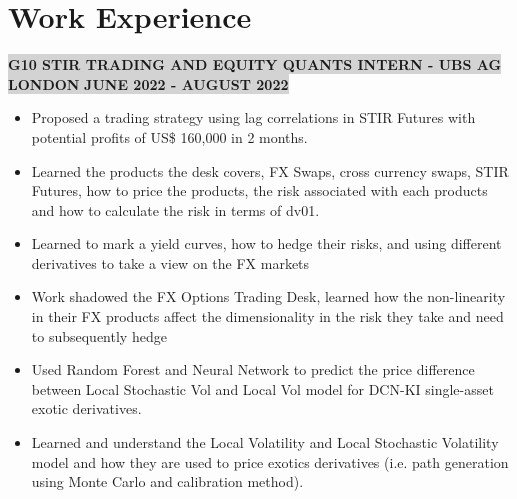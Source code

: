 \documentclass[10pt]{article}
\begin{document}
\section*{\sffamily Work Experience}
\vspace{-0.25cm}

\begin{comment}
\begin{center}
{{\fontfamily{lmtt}\colorbox{lightgrey}{\textbf{PIPELINE ENGINEER - SHELL UK ABERDEEN } \quad \quad\quad\quad \quad \quad \quad\quad\quad \quad\quad\quad\quad\quad \quad \quad \quad  \quad \quad \qquad\textbf{NOVEMBER 2022 - CURRENT}}}}
\end{center}
\begin{itemize}
    \item 
\end{itemize}
\end{comment}

\begin{center}
{{\colorbox{lightgrey}{\textbf{G10 STIR TRADING AND EQUITY QUANTS INTERN - UBS AG LONDON }  \qquad \qquad\quad\quad \quad \quad  \quad  \quad \quad \qquad\textbf{JUNE 2022 - AUGUST 2022}}}}
\end{center}
\vspace{-0.6cm}
\begin{itemize}
\setlength\itemsep{0.1em}
    \item Proposed a trading strategy using lag correlations in STIR Futures with potential profits of US\$ 160,000 in 2 months. 
    \item Learned the products the desk covers, FX Swaps, cross currency swaps, STIR Futures, how to price the products, the risk associated with each products and how to calculate the risk in terms of dv01.
    \item Learned to mark a yield curves, how to hedge their risks, and using different derivatives to take a view on the FX markets
    \item Work shadowed the FX Options Trading Desk, learned how the non-linearity in their FX products affect the dimensionality in the risk they take and need to subsequently hedge
    \item Used Random Forest and Neural Network to predict the price difference between Local Stochastic Vol and Local Vol model for DCN-KI single-asset exotic derivatives. 
    \item Learned and understand the Local Volatility and Local Stochastic Volatility model and how they are used to price exotics derivatives (i.e. path generation using Monte Carlo and calibration method).
\end{itemize}
\end{document}
